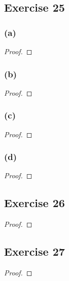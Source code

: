\documentclass[14pt]{extarticle}
\begin{document}
\subsection{Exercise 25}

\subsubsection{(a)}

\begin{proof}

\end{proof}

\subsubsection{(b)}

\begin{proof}

\end{proof}

\subsubsection{(c)}

\begin{proof}

\end{proof}

\subsubsection{(d)}

\begin{proof}

\end{proof}

\subsection{Exercise 26}

\begin{proof}

\end{proof}

\subsection{Exercise 27}

\begin{proof}

\end{proof}
\end{document}
